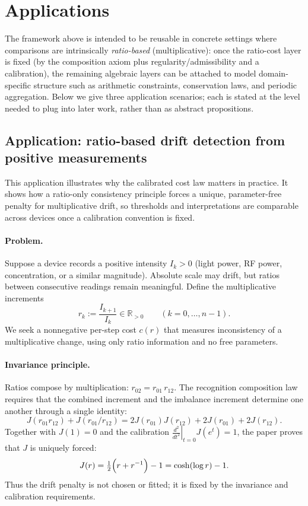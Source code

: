 \documentclass[11pt,reqno]{amsart}
\theoremstyle{plain}
\theoremstyle{definition}
\theoremstyle{remark}
\newcommand{\RR}{\mathbb{R}}
\newcommand{\1}{\mathbf{1}}
\begin{document}
\section*{Applications}
The framework above is intended to be reusable in concrete settings where comparisons are intrinsically
\emph{ratio-based} (multiplicative): once the ratio-cost layer is fixed (by the composition axiom plus
regularity/admissibility and a calibration), the remaining algebraic layers can be attached to model
domain-specific structure such as arithmetic constraints, conservation laws, and periodic aggregation.
Below we give three application scenarios; each is stated at the level needed to plug into later work,
rather than as abstract propositions.

\subsection{Application: ratio-based drift detection from positive measurements}\label{subsec:app-drift}
This application illustrates why the calibrated cost law matters in practice.  It shows how a ratio-only
consistency principle forces a unique, parameter-free penalty for multiplicative drift, so thresholds and
interpretations are comparable across devices once a calibration convention is fixed.

\paragraph{\textbf{Problem.}}
Suppose a device records a positive intensity $I_k>0$ (light power, RF power, concentration, or a similar
magnitude).  Absolute scale may drift, but ratios between consecutive readings remain meaningful.  Define
the multiplicative increments
\[
r_k:=\frac{I_{k+1}}{I_k}\in\RR_{>0}\qquad (k=0,\dots,n-1).
\]
We seek a nonnegative per-step cost $c(r)$ that measures inconsistency of a multiplicative change, using
only ratio information and no free parameters.

\paragraph{Invariance principle.}
Ratios compose by multiplication: $r_{02}=r_{01}\,r_{12}$.  The recognition composition law requires that the
combined increment and the imbalance increment determine one another through a single identity:
\[
J(r_{01}r_{12})+J(r_{01}/r_{12})
=2J(r_{01})J(r_{12})+2J(r_{01})+2J(r_{12}).
\]
Together with $J(1)=0$ and the calibration $\left.\frac{d^2}{dt^2}\right|_{t=0}J(e^t)=1$, the paper proves that
$J$ is uniquely forced:
\[
J(r)=\tfrac12\Bigl(r+r^{-1}\Bigr)-1=\cosh(\log r)-1.
\]
Thus the drift penalty is not chosen or fitted; it is fixed by the invariance and calibration requirements.
\end{document}
